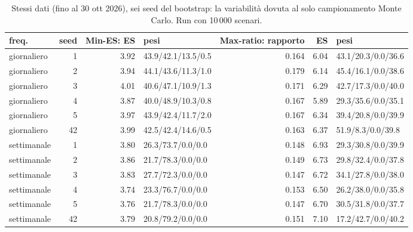 \begin{table}[htbp]\centering\footnotesize\setlength{\tabcolsep}{3.5pt}
\caption{Stessi dati (fino al 30 ott 2026), sei seed del bootstrap: la variabilit\`a dovuta al solo campionamento Monte Carlo. Run con 10\,000 scenari.}\label{tab:seeds_10k}
\begin{tabular}{lrrlrrl}\toprule
freq. & seed & Min-ES: ES & pesi & Max-ratio: rapporto & ES & pesi \\\midrule
giornaliero & 1 & 3.92 & 43.9/42.1/13.5/0.5 & 0.164 & 6.04 & 43.1/20.3/0.0/36.6 \\
giornaliero & 2 & 3.94 & 44.1/43.6/11.3/1.0 & 0.179 & 6.14 & 45.4/16.1/0.0/38.6 \\
giornaliero & 3 & 4.01 & 40.6/47.1/10.9/1.3 & 0.171 & 6.29 & 42.7/17.3/0.0/40.0 \\
giornaliero & 4 & 3.87 & 40.0/48.9/10.3/0.8 & 0.167 & 5.89 & 29.3/35.6/0.0/35.1 \\
giornaliero & 5 & 3.97 & 43.9/42.4/11.7/2.0 & 0.167 & 6.34 & 39.4/20.8/0.0/39.9 \\
giornaliero & 42 & 3.99 & 42.5/42.4/14.6/0.5 & 0.163 & 6.37 & 51.9/8.3/0.0/39.8 \\
settimanale & 1 & 3.80 & 26.3/73.7/0.0/0.0 & 0.148 & 6.93 & 29.3/30.8/0.0/39.9 \\
settimanale & 2 & 3.86 & 21.7/78.3/0.0/0.0 & 0.149 & 6.73 & 29.8/32.4/0.0/37.8 \\
settimanale & 3 & 3.83 & 27.7/72.3/0.0/0.0 & 0.147 & 6.72 & 34.1/27.8/0.0/38.0 \\
settimanale & 4 & 3.74 & 23.3/76.7/0.0/0.0 & 0.153 & 6.50 & 26.2/38.0/0.0/35.8 \\
settimanale & 5 & 3.76 & 21.7/78.3/0.0/0.0 & 0.147 & 6.70 & 30.5/31.8/0.0/37.7 \\
settimanale & 42 & 3.79 & 20.8/79.2/0.0/0.0 & 0.151 & 7.10 & 17.2/42.7/0.0/40.2 \\
\bottomrule\end{tabular}\end{table}

